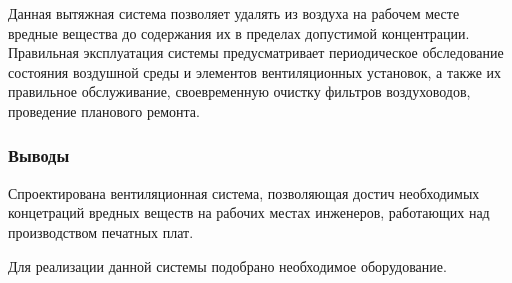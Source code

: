 Данная вытяжная система позволяет удалять из воздуха на рабочем месте вредные
вещества до содержания их в пределах допустимой концентрации. Правильная эксплуатация
системы предусматривает периодическое обследование состояния воздушной среды и
элементов вентиляционных установок, а также их правильное обслуживание, своевременную
очистку фильтров воздуховодов, проведение планового ремонта.

\subsubsection{Выводы}

Спроектирована вентиляционная система, позволяющая достич необходимых концетраций
вредных веществ на рабочих местах инженеров, работающих над производством печатных плат.

Для реализации данной системы подобрано необходимое оборудование.
